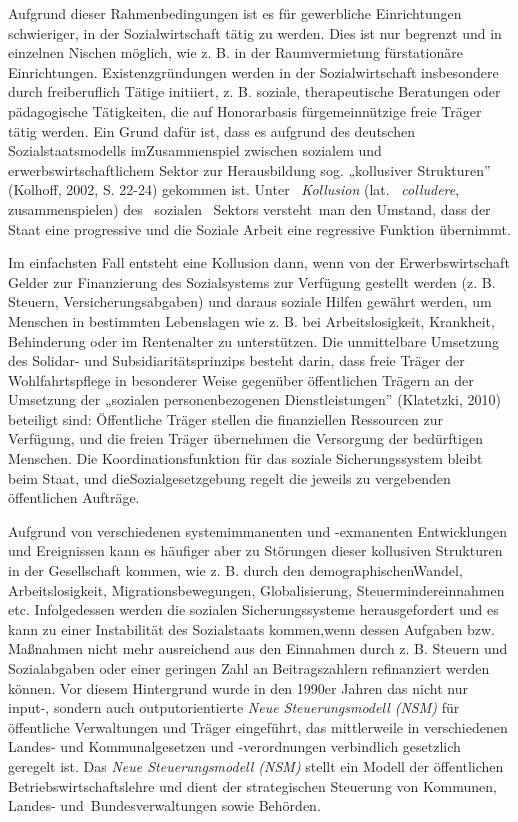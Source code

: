 \documentclass[
  letterpaper,
]{book}
\begin{document}
Aufgrund dieser Rahmenbedingungen ist es für gewerbliche Einrichtungen
schwieriger, in der Sozialwirtschaft tätig zu werden. Dies ist nur
begrenzt und in einzelnen Nischen möglich, wie z. B. in der
Raumvermietung fürstationäre Einrichtungen. Existenzgründungen werden in
der Sozialwirtschaft insbesondere durch freiberuflich Tätige initiiert,
z. B. soziale, therapeutische Beratungen oder pädagogische Tätigkeiten,
die auf Honorarbasis fürgemeinnützige freie Träger tätig werden. Ein
Grund dafür ist, dass es aufgrund des deutschen Sozialstaatsmodells
imZusammenspiel zwischen sozialem und erwerbswirtschaftlichem Sektor zur
Herausbildung sog. „kollusiver Strukturen'' (Kolhoff, 2002, S. 22-24)
gekommen ist. Unter~ \emph{Kollusion }(lat.~ \emph{colludere},~
zusammenspielen) des~ sozialen~ Sektors versteht~man den Umstand, dass
der Staat eine progressive und die Soziale Arbeit eine regressive
Funktion übernimmt.

Im einfachsten Fall entsteht eine Kollusion dann, wenn von der
Erwerbswirtschaft Gelder zur Finanzierung des Sozialsystems zur
Verfügung gestellt werden (z. B. Steuern, Versicherungsabgaben) und
daraus soziale Hilfen gewährt werden, um Menschen in bestimmten
Lebenslagen wie z. B. bei Arbeitslosigkeit, Krankheit, Behinderung oder
im Rentenalter zu unterstützen. Die unmittelbare Umsetzung des Solidar-
und Subsidiaritätsprinzips besteht darin, dass freie Träger der
Wohlfahrtspflege in besonderer Weise gegenüber öffentlichen Trägern an
der Umsetzung der „sozialen personenbezogenen Dienstleistungen''
(Klatetzki, 2010) beteiligt sind: Öffentliche Träger stellen die
finanziellen Ressourcen zur Verfügung, und die freien Träger übernehmen
die Versorgung der bedürftigen Menschen. Die Koordinationsfunktion für
das soziale Sicherungssystem bleibt beim Staat, und
dieSozialgesetzgebung regelt die jeweils zu vergebenden öffentlichen
Aufträge.

Aufgrund von verschiedenen systemimmanenten und -exmanenten
Entwicklungen und Ereignissen kann es häufiger aber zu Störungen dieser
kollusiven Strukturen in der Gesellschaft kommen, wie z. B. durch den
demographischenWandel, Arbeitslosigkeit, Migrationsbewegungen,
Globalisierung, Steuermindereinnahmen etc. Infolgedessen werden die
sozialen Sicherungssysteme herausgefordert und es kann zu einer
Instabilität des Sozialstaats kommen,wenn dessen Aufgaben bzw. Maßnahmen
nicht mehr ausreichend aus den Einnahmen durch z. B. Steuern und
Sozialabgaben oder einer geringen Zahl an Beitragszahlern refinanziert
werden können. Vor diesem Hintergrund wurde in den 1990er Jahren das
nicht nur input-, sondern auch outputorientierte \emph{Neue
Steuerungsmodell (NSM) }für öffentliche Verwaltungen und Träger
eingeführt, das mittlerweile in verschiedenen Landes- und
Kommunalgesetzen und -verordnungen verbindlich gesetzlich geregelt ist.
Das \emph{Neue Steuerungsmodell (NSM) }stellt ein Modell der
öffentlichen Betriebswirtschaftslehre und dient der strategischen
Steuerung von Kommunen, Landes- und~Bundesverwaltungen sowie Behörden.
\end{document}
